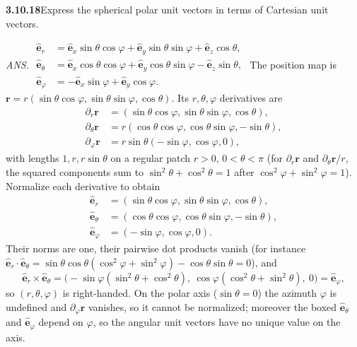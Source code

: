 \par\bigskip
\noindent\textbf{3.10.18}\quad Express the spherical polar unit vectors in
terms of Cartesian unit vectors.
\par\nobreak\hfill\emph{ANS.}\enspace
$\begin{aligned}
\hat{\mathbf{e}}_{r}&=\hat{\mathbf{e}}_{x}\sin\theta\cos\varphi
+\hat{\mathbf{e}}_{y}\sin\theta\sin\varphi+\hat{\mathbf{e}}_{z}\cos\theta,\\
\hat{\mathbf{e}}_{\theta}&=\hat{\mathbf{e}}_{x}\cos\theta\cos\varphi
+\hat{\mathbf{e}}_{y}\cos\theta\sin\varphi-\hat{\mathbf{e}}_{z}\sin\theta,\\
\hat{\mathbf{e}}_{\varphi}&=-\hat{\mathbf{e}}_{x}\sin\varphi
+\hat{\mathbf{e}}_{y}\cos\varphi.
\end{aligned}$
\solution
The position map is
$\mathbf r=r(\sin\theta\cos\varphi,\sin\theta\sin\varphi,\cos\theta)$.
Its $r,\theta,\varphi$ derivatives are
\[
\begin{aligned}
\partial_r\mathbf r&=(\sin\theta\cos\varphi,\sin\theta\sin\varphi,\cos\theta),\\
\partial_\theta\mathbf r&=r(\cos\theta\cos\varphi,\cos\theta\sin\varphi,-\sin\theta),\\
\partial_\varphi\mathbf r&=r\sin\theta(-\sin\varphi,\cos\varphi,0),
\end{aligned}
\]
with lengths $1,r,r\sin\theta$ on a regular patch $r>0$, $0<\theta<\pi$
(for $\partial_r\mathbf r$ and $\partial_\theta\mathbf r/r$, the
squared components sum to $\sin^2\theta+\cos^2\theta=1$ after
$\cos^2\varphi+\sin^2\varphi=1$).
Normalize each derivative to obtain
\[
\boxed{\begin{aligned}
\hat{\mathbf e}_r&=(\sin\theta\cos\varphi,\sin\theta\sin\varphi,\cos\theta),\\
\hat{\mathbf e}_\theta&=(\cos\theta\cos\varphi,\cos\theta\sin\varphi,-\sin\theta),\\
\hat{\mathbf e}_\varphi&=(-\sin\varphi,\cos\varphi,0).
\end{aligned}}
\]
Their norms are one, their pairwise dot products vanish (for instance
$\hat{\mathbf e}_r\cdot\hat{\mathbf e}_\theta
=\sin\theta\cos\theta(\cos^2\varphi+\sin^2\varphi)-\cos\theta\sin\theta=0$),
and
\[
\hat{\mathbf e}_r\times\hat{\mathbf e}_\theta
=\bigl(-\sin\varphi(\sin^2\theta+\cos^2\theta),\
\cos\varphi(\cos^2\theta+\sin^2\theta),\ 0\bigr)
=\hat{\mathbf e}_\varphi,
\]
so $(r,\theta,\varphi)$ is right-handed.
On the polar axis ($\sin\theta=0$) the azimuth $\varphi$ is undefined
and $\partial_\varphi\mathbf r$ vanishes, so it cannot be normalized;
moreover the boxed $\hat{\mathbf e}_\theta$ and $\hat{\mathbf e}_\varphi$
depend on $\varphi$, so the angular unit vectors have no unique value
on the axis.

